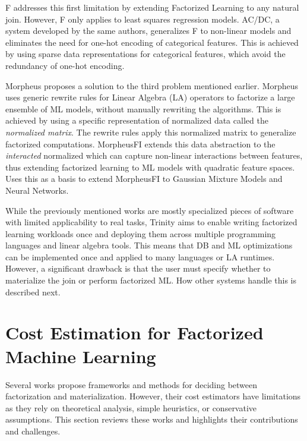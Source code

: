 F \cite{f_schleich} addresses this first limitation by extending Factorized Learning to any natural join. However, F only applies to least squares regression models. AC/DC, a system developed by the same authors, generalizes F to non-linear models and eliminates the need for one-hot encoding of categorical features. This is achieved by using sparse data representations for categorical features, which avoid the redundancy of one-hot encoding.

Morpheus \cite{morpheus} proposes a solution to the third problem mentioned earlier. Morpheus uses generic rewrite rules for Linear Algebra (LA) operators to factorize a large ensemble of ML models, without manually rewriting the algorithms. This is achieved by using a specific representation of normalized data called the \textit{normalized matrix}. The rewrite rules apply this normalized matrix to generalize factorized computations. MorpheusFI \cite{MorpheusFIEnablingOptimizingNonlinear2019} extends this data abstraction to the \textit{interacted} normalized which can capture non-linear interactions between features, thus extending factorized learning to ML models with quadratic feature spaces. \cite{f_gmm_DBLP:conf/icde/ChengKZ021} Uses this as a basis to extend MorpheusFI to Gaussian Mixture Models and Neural Networks.

While the previously mentioned works are mostly specialized pieces of software with limited applicability to real tasks, Trinity \cite{TrinityPolyglotFrameworkFactorized2021} aims to enable writing factorized learning workloads once and deploying them across multiple programming languages and linear algebra tools. This means that DB and ML optimizations can be implemented once and applied to many languages or LA runtimes. However, a significant drawback is that the user must specify whether to materialize the join or perform factorized ML. How other systems handle this is described next. 

\section{Cost Estimation for Factorized Machine Learning}
\label{sec:3-cost-estimation-for-factorized-ml}
Several works propose frameworks and methods for deciding between factorization and materialization. However, their cost estimators have limitations as they rely on theoretical analysis, simple heuristics, or conservative assumptions. This section reviews these works and highlights their contributions and challenges.

